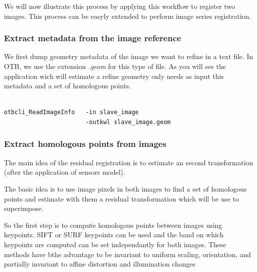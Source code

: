 \begin{center}
     \end{center}


We will now illustrate this process by applying this workflow to register two
images. This process can be easyly extended to perform image series
registration.


\subsubsection{Extract metadata from the image reference}

We first dump geometry metadata of the image we want to refine in a text
file. In OTB, we use the extension \textit{.geom} for this type of file. As you
will see the application wich will estimate a refine geometry only needs as
input this metadata and a set of homologous points.

\begin{verbatim}

otbcli_ReadImageInfo   -in slave_image 
                       -outkwl slave_image.geom 

\end{verbatim}


\subsubsection{Extract homologous points from images}

The main idea of the residual registration is to estimate an second
transformation (after the application of sensors model).

The basic idea is to use image pixels in both images to find a set of homologous
points and estimate with them a residual transformation which will be use to
superimpose.
  
So the first step is to compute homologous points between images using
keypoints. SIFT or SURF keypoints can be used and the band on which keypoints
are computed can be set independantly for both images. These methods have bthe
advantage to be invariant to uniform scaling, orientation, and partially
invariant to affine distortion and illumination changes

